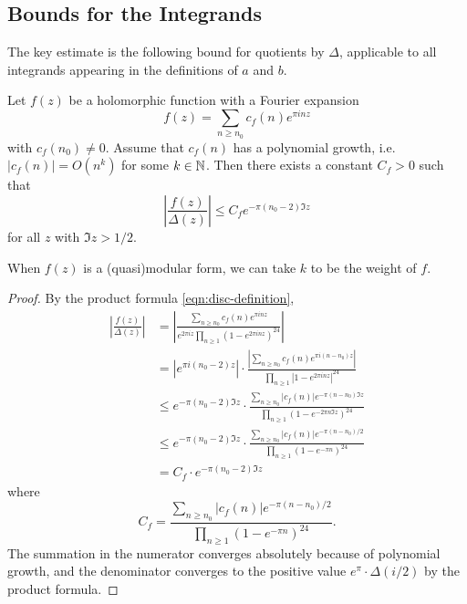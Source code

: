 \subsection{Bounds for the Integrands}

The key estimate is the following bound for quotients by $\Delta$, applicable to all integrands appearing in the definitions of $a$ and $b$.

\begin{lemma}\label{lemma:mod-div-disc-bound}\leanok
Let $f(z)$ be a holomorphic function with a Fourier expansion
\begin{equation}
    f(z) = \sum_{n \ge n_0} c_f(n) e^{\pi i n z}
\end{equation}
with $c_f(n_0) \ne 0$.
Assume that $c_f(n)$ has a polynomial growth, i.e. $|c_f(n)| = O(n^k)$ for some $k \in \mathbb{N}$.
Then there exists a constant $C_f > 0$ such that
\begin{equation}
    \left|\frac{f(z)}{\Delta(z)}\right| \le C_f e^{-\pi (n_0 - 2) \Im z}
\end{equation}
for all $z$ with $\Im z > 1/2$.
\end{lemma}
When $f(z)$ is a (quasi)modular form, we can take $k$ to be the weight of $f$.


\begin{proof}\leanok
By the product formula \eqref{eqn:disc-definition},
\begin{align}
    \left|\frac{f(z)}{\Delta(z)}\right| &= \left|\frac{\sum_{n \ge n_0} c_f(n) e^{\pi i n z}}{e^{2 \pi i z}\prod_{n \ge 1} (1 - e^{2\pi i n z})^{24}}\right| \\
    &= |e^{\pi i (n_0 - 2)z}| \cdot \frac{|\sum_{n \ge n_0} c_f(n) e^{\pi i (n - n_0) z}|}{\prod_{n \ge 1} |1 - e^{2\pi i n z}|^{24}} \\
    &\le e^{-\pi (n_0 - 2) \Im z} \cdot \frac{\sum_{n \ge n_0} |c_f(n)| e^{-\pi (n - n_0) \Im z}}{\prod_{n \ge 1} (1 - e^{- 2\pi n \Im z})^{24}} \\
    &\le e^{-\pi (n_0 - 2) \Im z} \cdot \frac{\sum_{n \ge n_0} |c_f(n)| e^{-\pi (n - n_0) / 2}}{\prod_{n \ge 1} (1 - e^{-\pi n})^{24}} \\
    &= C_f \cdot e^{-\pi (n_0 - 2) \Im z}
\end{align}
where
\begin{equation}
    C_f = \frac{\sum_{n \ge n_0} |c_f(n)| e^{-\pi (n - n_0) / 2}}{\prod_{n \ge 1} (1 - e^{-\pi n})^{24}}.
\end{equation}
The summation in the numerator converges absolutely because of polynomial growth, and the denominator converges to the positive value $e^{\pi} \cdot \Delta(i/2)$ by the product formula.
\end{proof}

